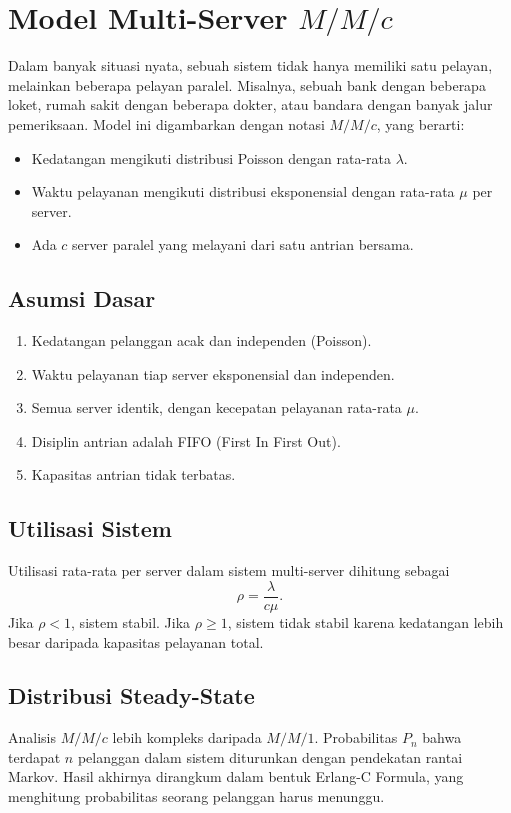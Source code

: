 \documentclass{bukumjh}
\begin{document}
\section{Model Multi-Server $M/M/c$}

Dalam banyak situasi nyata, sebuah sistem tidak hanya memiliki satu pelayan, melainkan beberapa pelayan paralel. Misalnya, sebuah bank dengan beberapa loket, rumah sakit dengan beberapa dokter, atau bandara dengan banyak jalur pemeriksaan. Model ini digambarkan dengan notasi $M/M/c$, yang berarti:
\begin{itemize}
    \item Kedatangan mengikuti distribusi Poisson dengan rata-rata $\lambda$.
    \item Waktu pelayanan mengikuti distribusi eksponensial dengan rata-rata $\mu$ per server.
    \item Ada $c$ server paralel yang melayani dari satu antrian bersama.
\end{itemize}

\subsection{Asumsi Dasar}
\begin{enumerate}
    \item Kedatangan pelanggan acak dan independen (Poisson).
    \item Waktu pelayanan tiap server eksponensial dan independen.
    \item Semua server identik, dengan kecepatan pelayanan rata-rata $\mu$.
    \item Disiplin antrian adalah FIFO (First In First Out).
    \item Kapasitas antrian tidak terbatas.
\end{enumerate}

\subsection{Utilisasi Sistem}
Utilisasi rata-rata per server dalam sistem multi-server dihitung sebagai
\[
\rho = \frac{\lambda}{c\mu}.
\]
Jika $\rho < 1$, sistem stabil. Jika $\rho \geq 1$, sistem tidak stabil karena kedatangan lebih besar daripada kapasitas pelayanan total.

\subsection{Distribusi Steady-State}
Analisis $M/M/c$ lebih kompleks daripada $M/M/1$. Probabilitas $P_n$ bahwa terdapat $n$ pelanggan dalam sistem diturunkan dengan pendekatan rantai Markov. Hasil akhirnya dirangkum dalam bentuk {\jsg Erlang-C Formula}, yang menghitung probabilitas seorang pelanggan harus menunggu.
\end{document}
